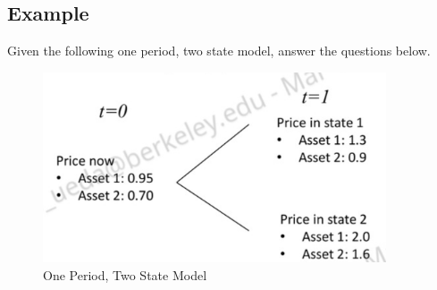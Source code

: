 \documentclass[11pt]{article}
\begin{document}
\subsection{Example}
Given the following one period, two state model, answer the questions below. 
\begin{figure}[H] 
    \centering 
    \includegraphics[width=4in]{imgs/example1.png}
    \caption{One Period, Two State Model}
\end{figure}
\end{document}
